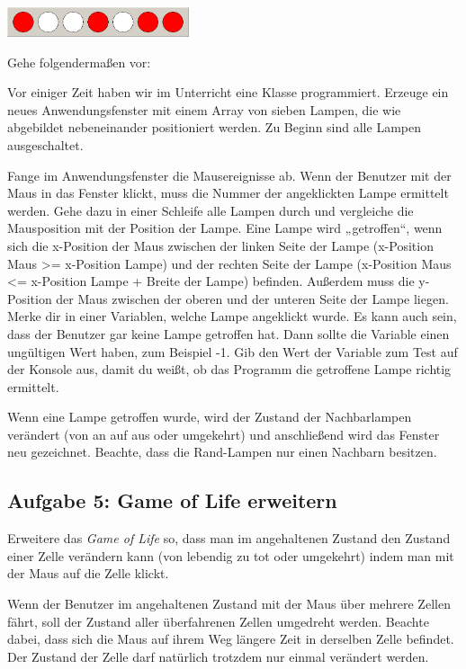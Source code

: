 \begin{center}
\includegraphics[width=0.4\textwidth]{./inf/SEKII/22_Java_Mausereignisse/Lampenproblem.png}
\end{center}

Gehe folgendermaßen vor:

\begin{compactenum}[a)]
\item Vor einiger Zeit haben wir im Unterricht eine Klasse 
programmiert. Erzeuge ein neues Anwendungsfenster mit einem Array von sieben
Lampen, die wie abgebildet nebeneinander positioniert werden. Zu Beginn sind
alle Lampen ausgeschaltet.

\item Fange im Anwendungsfenster die Mausereignisse ab. Wenn der Benutzer mit
der Maus in das Fenster klickt, muss die Nummer der angeklickten Lampe
ermittelt werden. Gehe dazu in einer Schleife alle Lampen durch und vergleiche
die Mausposition mit der Position der Lampe. Eine Lampe wird „getroffen“, wenn
sich die x-Position der Maus zwischen der linken Seite der Lampe (x-Position
Maus >= x-Position Lampe) und der rechten Seite der Lampe (x-Position Maus <=
x-Position Lampe + Breite der Lampe) befinden. Außerdem muss die y-Position der
Maus zwischen der oberen und der unteren Seite der Lampe liegen. Merke dir in
einer Variablen, welche Lampe angeklickt wurde. Es kann auch sein, dass der
Benutzer gar keine Lampe getroffen hat. Dann sollte die Variable einen
ungültigen Wert haben, zum Beispiel -1. Gib den Wert der Variable zum Test auf
der Konsole aus, damit du weißt, ob das Programm die getroffene Lampe richtig
ermittelt.

\item Wenn eine Lampe getroffen wurde, wird der Zustand der Nachbarlampen
verändert (von an auf aus oder umgekehrt) und anschließend wird das Fenster neu
gezeichnet. Beachte, dass die Rand-Lampen nur einen Nachbarn besitzen.
\end{compactenum}


\subsection{Aufgabe 5: Game of Life erweitern}

\begin{compactenum}[a)]
\item Erweitere das \emph{Game of Life} so, dass man im angehaltenen Zustand den
Zustand einer Zelle verändern kann (von lebendig zu tot oder umgekehrt) indem
man mit der Maus auf die Zelle klickt.

\item Wenn der Benutzer im angehaltenen Zustand mit der Maus über mehrere Zellen
fährt, soll der Zustand aller überfahrenen Zellen umgedreht werden. Beachte
dabei, dass sich die Maus auf ihrem Weg längere Zeit in derselben Zelle
befindet. Der Zustand der Zelle darf natürlich trotzdem nur einmal verändert
werden.
\end{compactenum}


